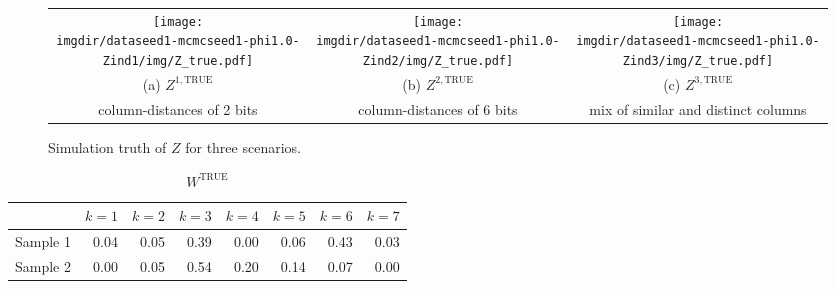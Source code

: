 \documentclass[10pt]{article} %
\def\true{\text{TRUE}}
\def\imgdir{../../results/test-sim-6-7-22}
\begin{document}
\begin{figure}[H]
  \begin{center}  %
    \begin{tabular}{ccc}
      \texttt{[image: \\imgdir/dataseed1-mcmcseed1-phi1.0-Zind1/img/Z\_true.pdf]} &
      \texttt{[image: \\imgdir/dataseed1-mcmcseed1-phi1.0-Zind2/img/Z\_true.pdf]} &
      \texttt{[image: \\imgdir/dataseed1-mcmcseed1-phi1.0-Zind3/img/Z\_true.pdf]} \\
      (a) $Z^{1,\true}$ &
      (b) $Z^{2,\true}$ &
      (c) $Z^{3,\true}$ \\
      column-distances of 2 bits &
      column-distances of 6 bits &
      mix of similar and distinct columns \\
    \end{tabular}
  \end{center}
  \caption{Simulation truth of $Z$ for three scenarios.}
  \label{fig:Z-true}
\end{figure}

\begin{table}[ht]
  \centering
  \begin{tabular}{rrrrrrrr}
    \hline
    & $k=1$ & $k=2$ & $k=3$ & $k=4$ & $k=5$ & $k=6$ & $k=7$ \\
    \hline
    Sample 1 & 0.04 & 0.05 & 0.39 & 0.00 & 0.06 & 0.43 & 0.03 \\
    Sample 2 & 0.00 & 0.05 & 0.54 & 0.20 & 0.14 & 0.07 & 0.00 \\
    \hline
  \end{tabular}
  \caption{$W^\true$}
  \label{tab:W-true}
\end{table}
\end{document}
